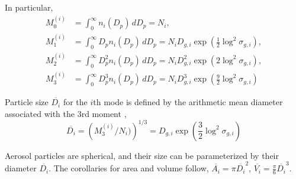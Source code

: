 In particular,
\begin{subequations}
  \begin{align}
    M_0^{(i)} &= \int_0^\infty n_i(D_p)\,d D_p = N_i,\\
    M_1^{(i)} &= \int_0^\infty D_p n_i(D_p)\,d D_p = N_iD_{g,i}\exp({\frac{1}{2}\log^2\sigma_{g,i}}),\\
    M_2^{(i)} &= \int_0^\infty D_p^2n_i(D_p)\,d D_p = N_iD_{g,i}^2\exp(2\log^2\sigma_{g,i}),\\
    M_3^{(i)} &= \int_0^\infty D_p^3n_i(D_p)\,d D_p = N_iD_{g,i}^3\exp(\frac{9}{2}\log^2\sigma_{g,i})
  \end{align}
\end{subequations}


\begin{defn}
  Particle size $\overline{D_i}$ for the $i$th mode is defined by the arithmetic mean diameter associated with the 3rd moment \cite[eqn.~(1)]{Whitby1981}, 
  \begin{equation}
    \overline{D_i} = \left(M_3^{(i)}/N_i)\right)^{1/3} = D_{g,i}\exp\left(\frac{3}{2}\log^2\sigma_{g,i}\right)
  \end{equation}
\end{defn}

\begin{assume} Aerosol particles are spherical, and their size can be parameterized by their diameter $\overline{D_i}$.
The corollaries for area and volume follow, $\overline{A_i} = \pi\overline{D_i}^2$, $\overline{V_i} = \frac{\pi}{6}\overline{D_i}^3$.
\end{assume}



